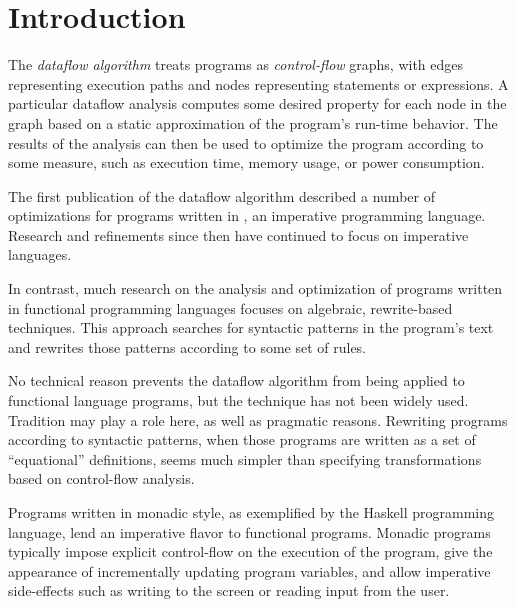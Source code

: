 \dodocclass



\chapter{Introduction}

The \emph{dataflow algorithm} treats programs as \emph{control-flow}
graphs, with edges representing execution paths and nodes representing
statements or expressions. A particular dataflow analysis computes
some desired property for each node in the graph based on a static
approximation of the program's run-time behavior. The results of the
analysis can then be used to optimize the program according to some
measure, such as execution time, memory usage, or power
consumption. 

The first publication of the dataflow algorithm \citep{Kildall1973}
described a number of optimizations for programs written in \algol, an
imperative programming language. Research and refinements since then
have continued to focus on imperative languages.

 In
contrast, much research on the analysis and optimization of programs
written in functional programming languages focuses on algebraic,
rewrite-based techniques. This approach searches for syntactic
patterns in the program's text and rewrites those patterns according
to some set of rules.

No technical reason prevents the dataflow algorithm from being applied
to functional language programs, but the technique has not been widely
used. Tradition may play a role here, as well as pragmatic
reasons. Rewriting programs according to syntactic patterns, when
those programs are written as a set of ``equational'' definitions, seems much
simpler than specifying transformations based on control-flow
analysis. 

Programs written in monadic style, as exemplified by the Haskell
programming language, lend an imperative flavor to functional
programs. Monadic programs typically impose explicit control-flow on
the execution of the program, give the appearance of incrementally
updating program variables, and allow imperative side-effects such as
writing to the screen or reading input from the user.

